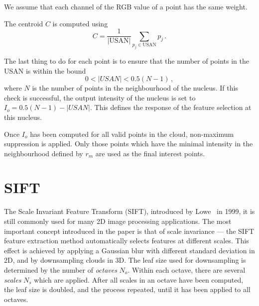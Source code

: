 \documentclass[11pt,a4paper]{kth-mag}
\begin{document}
We assume that each channel of the RGB value of a point has the same weight.

The centroid $C$ is computed using
\begin{equation}
  \label{eq:11}
  C=\frac{1}{\left|\text{USAN}\right|}\sum_{p_j \in \text{USAN}}p_j\,.
\end{equation}

The last thing to do for each point is to ensure that the number of points in
the USAN is within the bound
\begin{equation}
  \label{eq:13}
  0 < \left| USAN \right| < 0.5(N-1)\,,
\end{equation}
where $N$ is the number of points in the neighbourhood of the nucleus. If this
check is successful, the output intensity of the nucleus is set to
$I_o=0.5(N-1)-\left|USAN\right|$. This defines the response of the feature
selection at this nucleus.


Once $I_o$ has been computed for all valid points in the cloud, non-maximum
suppression is applied. Only those points which have the minimal intensity in
the neighbourhood defined by $r_m$ are used as the final interest points.

\section{SIFT}
The Scale Invariant Feature Transform (SIFT), introduced by
Lowe~\cite{lowe2004distinctive} in 1999, it is still commonly used for many 2D
image processing applications. The most important concept introduced in the
paper is that of scale invariance --- the SIFT feature extraction method
automatically selects features at different scales. This effect is achieved by
applying a Gaussian blur with different standard deviation in 2D, and by
downsampling clouds in 3D. The leaf size used for downsampling is determined by
the number of \emph{octaves} $N_o$. Within each octave, there are several
\emph{scales} $N_s$ which are applied. After all scales in an octave have been
computed, the leaf size is doubled, and the process repeated, until it has been
applied to all octaves.
\end{document}

